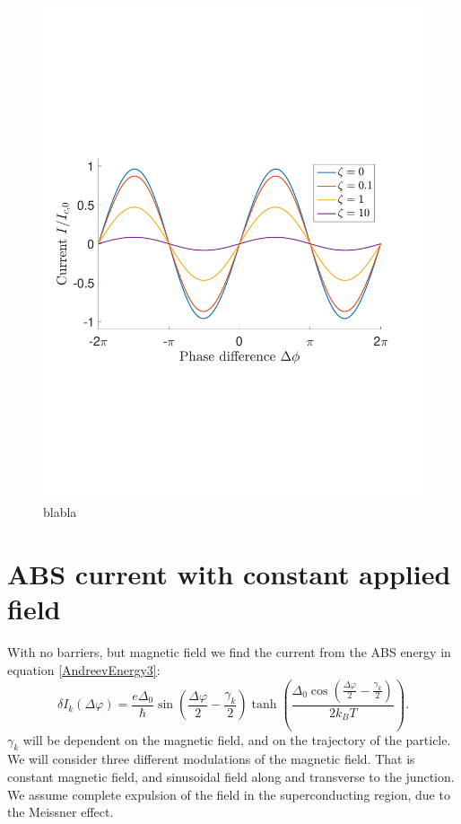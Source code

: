 \begin{figure}[hhh]
\centering
\includegraphics[width=12cm,clip=true,trim=0cm 7cm 1cm 7cm]{fig/WithoutField}
\caption{blabla}
\label{fig:motionEarth}
\end{figure}

\section{ABS current with constant applied field}
With no barriers, but magnetic field we find the current from the ABS energy in equation \eqref{AndreevEnergy3}:
\begin{equation}
    \delta I_k(\Delta \varphi) = \frac{e\Delta_0}{\hbar} \sin\left(\frac{\Delta \varphi}{2} - \frac{\gamma_k}{2}\right)\tanh\left(\frac{\Delta_0\cos\left(\frac{\Delta \varphi}{2} - \frac{\gamma_k}{2}\right)}{2k_BT}\right).
    \label{dIwithB}
\end{equation}
$\gamma_k$ will be dependent on the magnetic field, and on the trajectory of the particle. We will consider three different modulations of the magnetic field. That is constant magnetic field, and sinusoidal field along and transverse to the junction. We assume complete expulsion of the field in the superconducting region, due to the Meissner effect.

